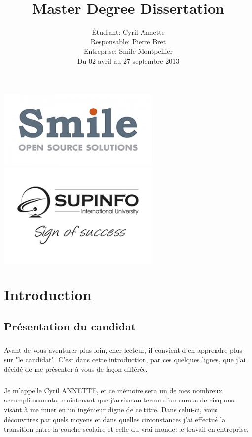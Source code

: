 \documentclass[12pt,a4paper,article]{memoir} %
\title{Master Degree Dissertation}
\author{Étudiant: Cyril Annette\\
Responsable: Pierre Bret\\
Entreprise: Smile Montpellier\\
Du 02 avril au 27 septembre 2013\\
}
\date{} %
\begin{document}
\maketitle
\begin{center}
	\includegraphics[width=300px]{smile.jpg}
	\includegraphics[width=300px]{supinfo.jpg}
\end{center}

\newpage
\tableofcontents* %
\newpage

\chapter{Introduction}
\section{Présentation du candidat}

\paragraph{}
Avant de vous aventurer plus loin, cher lecteur, il convient d'en apprendre plus sur "le candidat". C'est dans cette introduction, par ces quelques lignes, que j'ai décidé de me présenter à vous de façon différée.

\paragraph{}
Je m'appelle Cyril ANNETTE, et ce mémoire sera un de mes nombreux accomplissements, maintenant que j'arrive au terme d'un cursus de cinq ans visant à me muer en un ingénieur digne de ce titre. Dans celui-ci, vous découvrirez par quels moyens et dans quelles circonstances j'ai effectué la transition entre la couche scolaire et celle du  vrai monde: le travail en entreprise.
\end{document}
